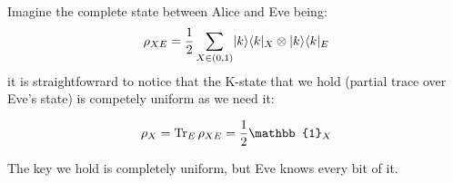 \begin{example}
	Imagine the complete state between Alice and Eve being:
	\begin{equation}
		\rho_{XE}= \frac{1}{2} \sum_{X \in (0,1)} \lvert k\rangle\langle k\rvert_X \otimes \lvert k\rangle\langle k\rvert_E
		\label{eq:Eveknowseverything}
	\end{equation}
	it is straightfowrard to notice that the K-state that we hold (partial trace over Eve's state) is competely uniform as we need it:

	\begin{equation}
		\rho_X = \Tr_E \rho_{XE} = \frac{1}{2} \mathbb{1}_X
	\end{equation}

	The key we hold is completely uniform, but Eve knows every bit of it.
\end{example}
%
